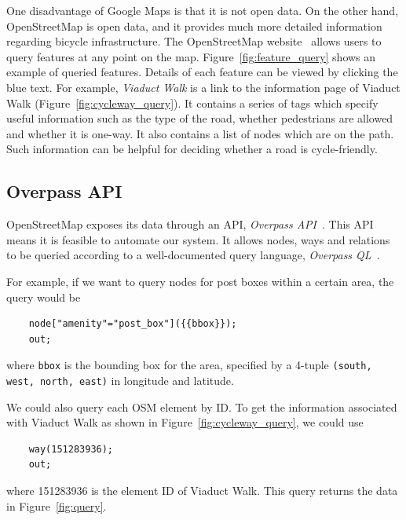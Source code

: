 \documentclass[12pt,a4paper]{report}
\begin{document}
One disadvantage of Google Maps is that it is not open data. On the other hand, OpenStreetMap is open data, and it provides much more detailed information regarding bicycle infrastructure. The OpenStreetMap website~\cite{OpenStreetMap} allows users to query features at any point on the map. Figure~\ref{fig:feature_query} shows an example of queried features. Details of each feature can be viewed by clicking the blue text. For example, \textit{Viaduct Walk} is a link to the information page of Viaduct Walk (Figure~\ref{fig:cycleway_query}). It contains a series of tags which specify useful information such as the type of the road, whether pedestrians are allowed and whether it is one-way. It also contains a list of nodes which are on the path. Such information can be helpful for deciding whether a road is cycle-friendly.

\subsection{Overpass API}
OpenStreetMap exposes its data through an API, \textit{Overpass API}~\cite{wiki:overpass}. This API means it is feasible to automate our system. It allows nodes, ways and relations to be queried according to a well-documented query language, \textit{Overpass QL}~\cite{wiki:overpassql}. 

For example, if we want to query nodes for post boxes within a certain area, the query would be
\begin{verbatim}
    node["amenity"="post_box"]({{bbox}});
    out;
\end{verbatim}
where \texttt{bbox} is the bounding box for the area, specified by a 4-tuple \texttt{(south, west, north, east)} in longitude and latitude.

We could also query each OSM element by ID. To get the information associated with Viaduct Walk as shown in Figure~\ref{fig:cycleway_query}, we could use
\begin{verbatim}
    way(151283936);
    out;
\end{verbatim}
where 151283936 is the element ID of Viaduct Walk. This query returns the data in Figure~\ref{fig:query}.
\end{document}
